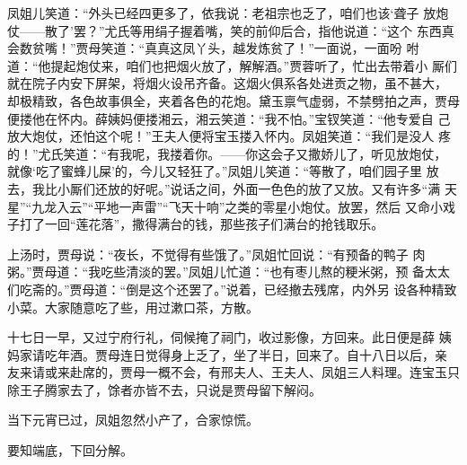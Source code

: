 凤姐儿笑道：“外头已经四更多了，依我说：老祖宗也乏了，咱们也该‘聋子
放炮仗——散了’罢？”尤氏等用绢子握着嘴，笑的前仰后合，指他说道：“这个
东西真会数贫嘴！”贾母笑道：“真真这凤丫头，越发炼贫了！”一面说，一面吩
咐道：“他提起炮仗来，咱们也把烟火放了，解解酒。”贾蓉听了，忙出去带着小
厮们就在院子内安下屏架，将烟火设吊齐备。这烟火俱系各处进贡之物，虽不甚大，
却极精致，各色故事俱全，夹着各色的花炮。黛玉禀气虚弱，不禁劈拍之声，贾母
便搂他在怀内。薛姨妈便搂湘云，湘云笑道：“我不怕。”宝钗笑道：“他专爱自
己放大炮仗，还怕这个呢！”王夫人便将宝玉搂入怀内。凤姐笑道：“我们是没人
疼的！”尤氏笑道：“有我呢，我搂着你。——你这会子又撒娇儿了，听见放炮仗，
就像‘吃了蜜蜂儿屎’的，今儿又轻狂了。”凤姐儿笑道：“等散了，咱们园子里
放去，我比小厮们还放的好呢。”说话之间，外面一色色的放了又放。又有许多“满
天星”“九龙入云”“平地一声雷”“飞天十响”之类的零星小炮仗。放罢，然后
又命小戏子打了一回“莲花落”，撒得满台的钱，那些孩子们满台的抢钱取乐。

上汤时，贾母说：“夜长，不觉得有些饿了。”凤姐忙回说：“有预备的鸭子
肉粥。”贾母道：“我吃些清淡的罢。”凤姐儿忙道：“也有枣儿熬的粳米粥，预
备太太们吃斋的。”贾母道：“倒是这个还罢了。”说着，已经撤去残席，内外另
设各种精致小菜。大家随意吃了些，用过漱口茶，方散。

十七日一早，又过宁府行礼，伺候掩了祠门，收过影像，方回来。此日便是薛
姨妈家请吃年酒。贾母连日觉得身上乏了，坐了半日，回来了。自十八日以后，亲
友来请或来赴席的，贾母一概不会，有邢夫人、王夫人、凤姐三人料理。连宝玉只
除王子腾家去了，馀者亦皆不去，只说是贾母留下解闷。

当下元宵已过，凤姐忽然小产了，合家惊慌。

要知端底，下回分解。